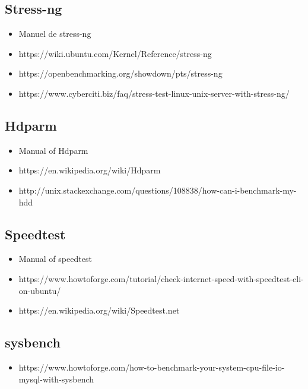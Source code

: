 \documentclass[11pt]{article}
\begin{document}
\subsection{Stress-ng}
\begin{itemize}
	\item Manuel de stress-ng 
	\item https://wiki.ubuntu.com/Kernel/Reference/stress-ng
	\item https://openbenchmarking.org/showdown/pts/stress-ng
	\item https://www.cyberciti.biz/faq/stress-test-linux-unix-server-with-stress-ng/
\end{itemize}
\subsection{Hdparm}
\begin{itemize}
\item Manual of Hdparm
\item https://en.wikipedia.org/wiki/Hdparm
\item http://unix.stackexchange.com/questions/108838/how-can-i-benchmark-my-hdd
\end{itemize}
\subsection{Speedtest}
\begin{itemize}
\item Manual of speedtest 
\item https://www.howtoforge.com/tutorial/check-internet-speed-with-speedtest-cli-on-ubuntu/
\item https://en.wikipedia.org/wiki/Speedtest.net
\end{itemize}
\subsection{sysbench}
\begin{itemize}
\item https://www.howtoforge.com/how-to-benchmark-your-system-cpu-file-io-mysql-with-sysbench

\end{itemize}
\end{document}
